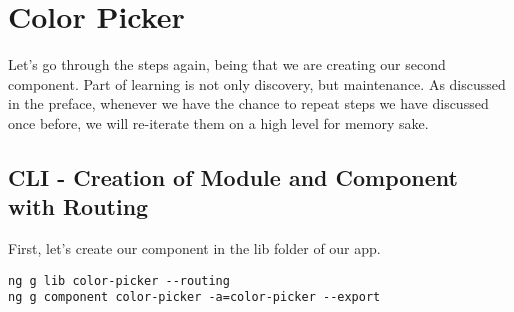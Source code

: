 \maketitle{}
\section{ Color Picker }

Let's go through the steps again, being that we are creating our second
component. Part of learning is not only discovery, but maintenance. As discussed
in the preface, whenever we have the chance to repeat steps we have discussed
once before, we will re-iterate them on a high level for memory sake.

\subsection{ CLI - Creation of Module and Component with Routing }
First, let's create our component in the lib folder of our app.

\begin{lstlisting}
ng g lib color-picker --routing
ng g component color-picker -a=color-picker --export
\end{lstlisting}
